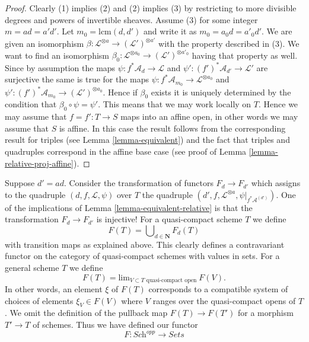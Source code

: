 \begin{proof}
Clearly (1) implies (2) and (2) implies (3) by restricting to
more divisible degrees and powers of invertible sheaves.
Assume (3) for some integer $m = ad = a'd'$. Let
$m_0 = \text{lcm}(d, d')$ and write it as $m_0 = a_0d = a'_0d'$.
We are given an isomorphism
$\beta : \mathcal{L}^{\otimes a} \to (\mathcal{L}')^{\otimes a'}$
with the property described in (3). We want to find an isomorphism
$\beta_0 : \mathcal{L}^{\otimes a_0} \to (\mathcal{L}')^{\otimes a'_0}$
having that property as well.
Since by assumption the maps $\psi : f^*\mathcal{A}_d \to \mathcal{L}$
and $\psi' : (f')^*\mathcal{A}_{d'} \to \mathcal{L}'$ are surjective the
same is true for the maps
$\psi : f^*\mathcal{A}_{m_0} \to \mathcal{L}^{\otimes a_0}$
and $\psi' : (f')^*\mathcal{A}_{m_0} \to (\mathcal{L}')^{\otimes a_0}$.
Hence if $\beta_0$ exists it is uniquely determined by the
condition that $\beta_0 \circ \psi = \psi'$. This means that
we may work locally on $T$. Hence we may assume that
$f = f' : T \to S$ maps into an affine open, in other words
we may assume that $S$ is affine. In this case the result follows
from the corresponding result for triples (see Lemma \ref{lemma-equivalent})
and the fact that triples and quadruples correspond in the
affine base case (see proof of Lemma \ref{lemma-relative-proj-affine}).
\end{proof}

\noindent
Suppose $d' = ad$. Consider the transformation of functors $F_d \to F_{d'}$
which assigns to the quadruple $(d, f, \mathcal{L}, \psi)$ over
$T$ the quadruple
$(d', f, \mathcal{L}^{\otimes a}, \psi|_{f^*\mathcal{A}^{(d')}})$.
One of the implications of Lemma \ref{lemma-equivalent-relative} is that the
transformation $F_d \to F_{d'}$ is injective!
For a quasi-compact scheme $T$ we define
$$
F(T) = \bigcup\nolimits_{d \in \mathbf{N}} F_d(T)
$$
with transition maps as explained above. This clearly defines a
contravariant functor on the category of quasi-compact schemes
with values in sets. For a general scheme
$T$ we define
$$
F(T)
=
\text{lim}_{V \subset T\text{ quasi-compact open}}\ F(V).
$$
In other words, an element $\xi$ of $F(T)$ corresponds to a compatible system
of choices of elements $\xi_V \in F(V)$ where $V$ ranges over the
quasi-compact opens of $T$.
We omit the definition of the pullback map $F(T) \to F(T')$
for a morphism $T' \to T$ of schemes.
Thus we have defined our functor
\begin{equation}
\label{equation-proj}
F : \textit{Sch}^{opp} \longrightarrow \textit{Sets}
\end{equation}

